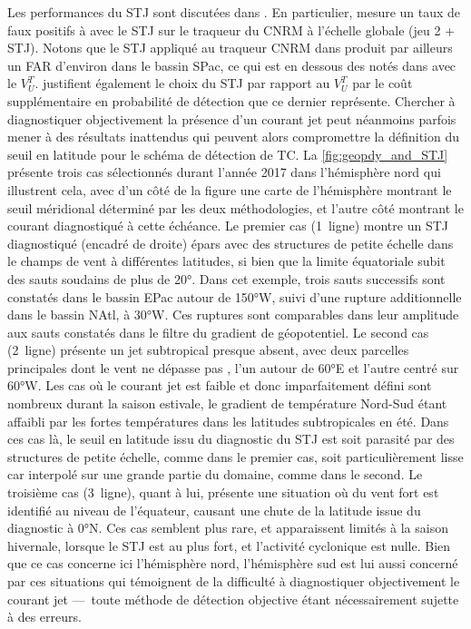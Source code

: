 \documentclass[../main.tex]{subfiles}
\begin{document}
Les performances du STJ sont discutées dans \textcite{bourdin_intercomparison_2022}. En particulier, \textcite{bourdin_intercomparison_2022} mesure un taux de
faux positifs à  avec le STJ sur le traqueur du CNRM à l'échelle globale (jeu 2 + STJ). Notons que le STJ appliqué au traqueur CNRM dans
\textcite{bourdin_intercomparison_2022} produit par ailleurs un FAR d'environ  dans le bassin SPac, ce qui est en dessous des  notés dans
\textcite{dulac_assessing_2023} avec le $V_U^T$. \textcite{bourdin_intercomparison_2022} justifient également le choix du STJ par rapport au $V_U^T$ par le coût
supplémentaire en probabilité de détection que ce dernier représente. Chercher à diagnostiquer objectivement la présence d'un courant jet peut néanmoins parfois
mener à des résultats inattendus qui peuvent alors compromettre la définition du seuil en latitude pour le schéma de détection de TC. La
\cref{fig:geopdy_and_STJ} présente trois cas sélectionnés durant l'année 2017 dans l'hémisphère nord qui illustrent cela, avec d'un côté de la figure une carte
de l'hémisphère montrant le seuil méridional déterminé par les deux méthodologies, et l'autre côté montrant le courant diagnostiqué à cette échéance. Le premier
cas (1\iere~ligne) montre un STJ diagnostiqué (encadré de droite) épars avec des structures de petite échelle dans le champs de vent à différentes latitudes, si
bien que la limite équatoriale subit des sauts soudains de plus de \ang{20}. Dans cet exemple, trois sauts successifs sont constatés dans le bassin EPac autour
de \ang{150}W, suivi d'une rupture additionnelle dans le bassin NAtl, à \ang{30}W. Ces ruptures sont comparables dans leur amplitude aux sauts constatés dans le
filtre du gradient de géopotentiel. Le second cas (2\ieme~ligne) présente un jet subtropical presque absent, avec deux parcelles principales dont le vent ne
dépasse pas , l'un autour de \ang{60}E et l'autre centré sur \ang{60}W. Les cas où le courant jet est faible et donc imparfaitement défini sont nombreux
durant la saison estivale, le gradient de température Nord-Sud étant affaibli par les fortes températures dans les latitudes subtropicales en été. Dans ces cas
là, le seuil en latitude issu du diagnostic du STJ est soit parasité par des structures de petite échelle, comme dans le premier cas, soit particulièrement
lisse car interpolé sur une grande partie du domaine, comme dans le second. Le troisième cas (3\ieme~ligne), quant à lui, présente une situation où du vent fort
est identifié au niveau de l'équateur, causant une chute de la latitude issue du diagnostic à \ang{0}N. Ces cas semblent plus rare, et apparaissent limités à
la saison hivernale, lorsque le STJ est au plus fort, et l'activité cyclonique est nulle. Bien que ce cas concerne ici l'hémisphère nord, l'hémisphère sud est
lui aussi concerné par ces situations qui témoignent de la difficulté à diagnostiquer objectivement le courant jet ---~toute méthode de détection objective
étant nécessairement sujette à des erreurs.
\end{document}
